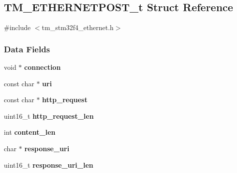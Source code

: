 \hypertarget{struct_t_m___e_t_h_e_r_n_e_t_p_o_s_t__t}{}\subsection{T\+M\+\_\+\+E\+T\+H\+E\+R\+N\+E\+T\+P\+O\+S\+T\+\_\+t Struct Reference}
\label{struct_t_m___e_t_h_e_r_n_e_t_p_o_s_t__t}


{\ttfamily \#include $<$tm\+\_\+stm32f4\+\_\+ethernet.\+h$>$}

\subsubsection*{Data Fields}
\begin{DoxyCompactItemize}
\item 
\hypertarget{struct_t_m___e_t_h_e_r_n_e_t_p_o_s_t__t_abea7ed80ddfcd3b1e36fd67989bdf0e8}{}void $\ast$ {\bfseries connection}\label{struct_t_m___e_t_h_e_r_n_e_t_p_o_s_t__t_abea7ed80ddfcd3b1e36fd67989bdf0e8}

\item 
\hypertarget{struct_t_m___e_t_h_e_r_n_e_t_p_o_s_t__t_a69ec24fb2d0a5f5e532deb9adaab81d6}{}const char $\ast$ {\bfseries uri}\label{struct_t_m___e_t_h_e_r_n_e_t_p_o_s_t__t_a69ec24fb2d0a5f5e532deb9adaab81d6}

\item 
\hypertarget{struct_t_m___e_t_h_e_r_n_e_t_p_o_s_t__t_add065c6cf2c73d8b68da34b5c7dbd299}{}const char $\ast$ {\bfseries http\+\_\+request}\label{struct_t_m___e_t_h_e_r_n_e_t_p_o_s_t__t_add065c6cf2c73d8b68da34b5c7dbd299}

\item 
\hypertarget{struct_t_m___e_t_h_e_r_n_e_t_p_o_s_t__t_adee3c0e15599bfc0d0b2a56e431b90bc}{}uint16\+\_\+t {\bfseries http\+\_\+request\+\_\+len}\label{struct_t_m___e_t_h_e_r_n_e_t_p_o_s_t__t_adee3c0e15599bfc0d0b2a56e431b90bc}

\item 
\hypertarget{struct_t_m___e_t_h_e_r_n_e_t_p_o_s_t__t_a80a1f21a9b54ef5a937907b7fc0ae687}{}int {\bfseries content\+\_\+len}\label{struct_t_m___e_t_h_e_r_n_e_t_p_o_s_t__t_a80a1f21a9b54ef5a937907b7fc0ae687}

\item 
\hypertarget{struct_t_m___e_t_h_e_r_n_e_t_p_o_s_t__t_adb5fd3ee3a0c3434d5fbd6306d11789b}{}char $\ast$ {\bfseries response\+\_\+uri}\label{struct_t_m___e_t_h_e_r_n_e_t_p_o_s_t__t_adb5fd3ee3a0c3434d5fbd6306d11789b}

\item 
\hypertarget{struct_t_m___e_t_h_e_r_n_e_t_p_o_s_t__t_aa363003c2485ce585b755115c9248db8}{}uint16\+\_\+t {\bfseries response\+\_\+uri\+\_\+len}\label{struct_t_m___e_t_h_e_r_n_e_t_p_o_s_t__t_aa363003c2485ce585b755115c9248db8}

\end{DoxyCompactItemize}


